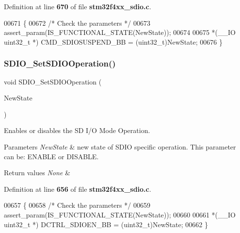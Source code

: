Definition at line \textbf{ 670} of file \textbf{ stm32f4xx\+\_\+sdio.\+c}.


\begin{DoxyCode}
00671 \{ 
00672   \textcolor{comment}{/* Check the parameters */}
00673   assert_param(IS_FUNCTIONAL_STATE(NewState));
00674   
00675   *(\_\_IO uint32\_t *) CMD_SDIOSUSPEND_BB = (uint32\_t)NewState;
00676 \}
\end{DoxyCode}
\mbox{\label{group__SDIO__Group4_ga24e210c185d5a7855cbaff4472a8f8d1}} 
\subsubsection{S\+D\+I\+O\+\_\+\+Set\+S\+D\+I\+O\+Operation()}
{\footnotesize\ttfamily void S\+D\+I\+O\+\_\+\+Set\+S\+D\+I\+O\+Operation (\begin{DoxyParamCaption}\item[{\textbf{ Functional\+State}}]{New\+State }\end{DoxyParamCaption})}



Enables or disables the SD I/O Mode Operation. 


\begin{DoxyParams}{Parameters}
{\em New\+State} & new state of S\+D\+IO specific operation. This parameter can be\+: E\+N\+A\+B\+LE or D\+I\+S\+A\+B\+LE. \\
\hline
\end{DoxyParams}

\begin{DoxyRetVals}{Return values}
{\em None} & \\
\hline
\end{DoxyRetVals}


Definition at line \textbf{ 656} of file \textbf{ stm32f4xx\+\_\+sdio.\+c}.


\begin{DoxyCode}
00657 \{ 
00658   \textcolor{comment}{/* Check the parameters */}
00659   assert_param(IS_FUNCTIONAL_STATE(NewState));
00660   
00661   *(\_\_IO uint32\_t *) DCTRL_SDIOEN_BB = (uint32\_t)NewState;
00662 \}
\end{DoxyCode}
\mbox{\label{group__SDIO__Group4_ga2baac4ea1bb6c2d94345d2712604338a}} 
